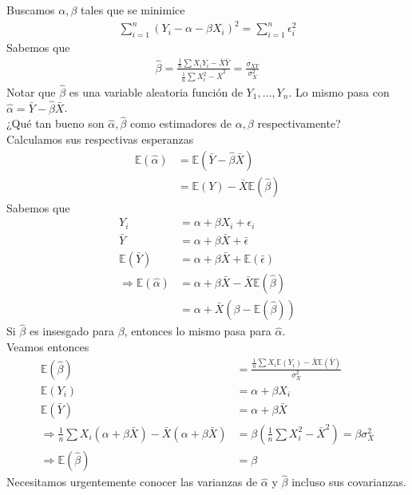 \documentclass[10pt]{article}
\theoremstyle{plain}
\theoremstyle{definition}
\begin{document}
Buscamos $\alpha, \beta$ tales que se minimice
\begin{align*}
\sum_{i=1}^n (Y_{i} - \alpha - \beta X_{i})^2 = \sum_{i=1}^{n} \epsilon_{i}^2
\end{align*}
Sabemos que 
\begin{align*}
\hat{\beta} = \frac{\frac{1}{n}\sum X_{i}Y_{i}- \bar{X}\bar{Y}}{\frac{1}{n}\sum X_{i}^2 - \bar{X}^2} = \frac{\sigma_{XY}}{\sigma_{X}^2}
\end{align*}
Notar que $\hat{\beta}$ es una variable aleatoria función de $Y_{1},\ldots,Y_{n}$. Lo mismo pasa con $\hat{\alpha} = \bar{Y}-\hat{\beta}\bar{X}$.\\

¿Qué tan bueno son $\hat{\alpha}, \hat{\beta}$ como estimadores de $\alpha,\beta$ respectivamente?\\

Calculamos sus respectivas esperanzas
\begin{align*}
\mathbb{E}(\hat{\alpha}) &= \mathbb{E}(\bar{Y}-\hat{\beta}\bar{X})\\
&= \mathbb{E}(Y)- \bar{X}\mathbb{E}(\hat{\beta})
\end{align*}
Sabemos que
\begin{align*}
Y_{i} &= \alpha + \beta X_{i} + \epsilon_{i}\\
\bar{Y} &= \alpha + \beta \bar{X} + \bar{\epsilon}\\
\mathbb{E}(\bar{Y}) &= \alpha + \beta \bar{X} + \mathbb{E}(\bar{\epsilon})\\
\Rightarrow \mathbb{E}(\hat{\alpha}) &= \alpha + \beta \bar{X} - \bar{X}\mathbb{E}(\hat{\beta})\\
&= \alpha + \bar{X}(\beta - \mathbb{E}(\hat{\beta}))
\end{align*}
Si $\hat{\beta}$ es insesgado para $\beta$, entonces lo mismo pasa para $\hat{\alpha}$.\\

Veamos entonces
\begin{align*}
\mathbb{E}(\hat{\beta}) &= \frac{\frac{1}{n}\sum X_{i}\mathbb{E}(Y_{i})- \bar{X}\mathbb{E}(\bar{Y})}{\sigma_{X}^2}\\
\mathbb{E}(Y_{i}) &= \alpha + \beta X_{i}\\
\mathbb{E}(\bar{Y}) &= \alpha + \beta \bar{X}\\
\Rightarrow \frac{1}{n}\sum X_{i}(\alpha + \beta \bar{X})  - \bar{X}(\alpha + \beta\bar{X}) &= \beta \left(\frac{1}{n}\sum X_{i}^2 - \bar{X}^2\right) = \beta \sigma_{X}^2\\
\Rightarrow \mathbb{E}(\hat{\beta}) &= \beta
\end{align*}
Necesitamos urgentemente conocer las varianzas de $\hat{\alpha}$ y $\hat{\beta}$ incluso sus covarianzas.\\
\end{document}

